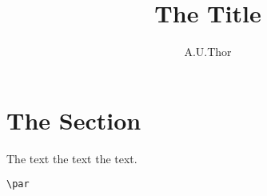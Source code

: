 \documentclass[11pt,a4paper]{scrartcl}
\begin{document}

\title{The Title}
\author{A.U.Thor}
\maketitle

\section{The Section}

The text the text the text.

\verb|\par|
\end{document}
